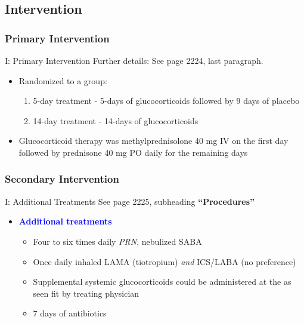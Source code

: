 \documentclass{beamer}
\newcommand{\pro}{\textcolor{blue}}
\begin{document}
	\subsection{Intervention}
		\subsubsection{Primary Intervention}
			\begin{frame}{I: Primary Intervention}
				Further details: See page 2224, last paragraph.\\
				\begin{itemize}
					\item Randomized to a group:
					\begin{enumerate}
						\item 5-day treatment - 5-days of glucocorticoids followed by 9 days of placebo
						\item 14-day treatment - 14-days of glucocorticoids
					\end{enumerate}
					\item Glucocorticoid therapy was methylprednisolone 40 mg IV on the first
					day followed by prednisone 40 mg PO daily for the remaining days
				\end{itemize}
			\end{frame}
		\subsubsection{Secondary Intervention}
			\begin{frame}{I: Additional Treatments}
				See page 2225, subheading \textbf{``Procedures''}
				\pause
				\begin{itemize}
					\item \pro{\textbf{Additional treatments}}
					\begin{itemize}
						\item Four to six times daily \textit{PRN}, nebulized SABA
						\item Once daily inhaled LAMA (tiotropium) \textit{and} ICS/LABA (no preference)
						\item Supplemental systemic glucocorticoids could be administered at the as seen fit by treating physician
						\item 7 days of antibiotics
					\end{itemize}
				\end{itemize}				
			\end{frame}
\end{document}
